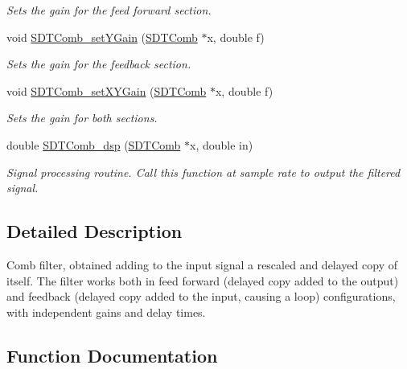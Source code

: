 \begin{DoxyCompactItemize}
\begin{DoxyCompactList}\small\item\em Sets the gain for the feed forward section. \end{DoxyCompactList}\item 
void \hyperlink{group__comb_ga18482b9ec18a83cf4dea55538319b32a}{S\+D\+T\+Comb\+\_\+set\+Y\+Gain} (\hyperlink{group__comb_ga6d48ca6dc0e03cd39bc44193e4d208db}{S\+D\+T\+Comb} $\ast$x, double f)
\begin{DoxyCompactList}\small\item\em Sets the gain for the feedback section. \end{DoxyCompactList}\item 
void \hyperlink{group__comb_gae288a3b9b776a5b492663dc40ac87267}{S\+D\+T\+Comb\+\_\+set\+X\+Y\+Gain} (\hyperlink{group__comb_ga6d48ca6dc0e03cd39bc44193e4d208db}{S\+D\+T\+Comb} $\ast$x, double f)
\begin{DoxyCompactList}\small\item\em Sets the gain for both sections. \end{DoxyCompactList}\item 
double \hyperlink{group__comb_ga476a303de520ccd185979a3ff10c9214}{S\+D\+T\+Comb\+\_\+dsp} (\hyperlink{group__comb_ga6d48ca6dc0e03cd39bc44193e4d208db}{S\+D\+T\+Comb} $\ast$x, double in)
\begin{DoxyCompactList}\small\item\em Signal processing routine. Call this function at sample rate to output the filtered signal. \end{DoxyCompactList}\end{DoxyCompactItemize}


\subsection{Detailed Description}
Comb filter, obtained adding to the input signal a rescaled and delayed copy of itself. The filter works both in feed forward (delayed copy added to the output) and feedback (delayed copy added to the input, causing a loop) configurations, with independent gains and delay times. 

\subsection{Function Documentation}
\hypertarget{group__comb_ga476a303de520ccd185979a3ff10c9214}{}
